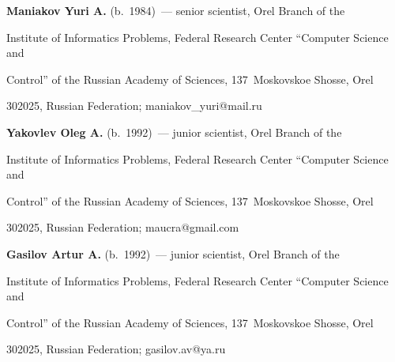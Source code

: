   


  \vspace*{3pt}


  


  \noindent


  \textbf{Maniakov Yuri A.} (b.\ 1984)~--- senior scientist, Orel Branch of the 


Institute of Informatics Problems, Federal Research Center ``Computer Science and 


Control'' of the Russian Academy of Sciences, 137~Moskovskoe Shosse, Orel 


302025, Russian Federation; \mbox{maniakov\_yuri@mail.ru}


  


  \vspace*{3pt}


  


  \noindent


  \textbf{Yakovlev Oleg A.} (b.\ 1992)~--- junior scientist, Orel Branch of the 


Institute of Informatics Problems, Federal Research Center ``Computer Science and 


Control'' of the Russian Academy of Sciences, 137~Moskovskoe Shosse, Orel 


302025, Russian Federation; \mbox{maucra@gmail.com}


  


  \vspace*{3pt}


  


  \noindent


  \textbf{Gasilov Artur A.} (b.\ 1992)~--- junior scientist, Orel Branch of the 


Institute of Informatics Problems, Federal Research Center ``Computer Science and 


Control'' of the Russian Academy of Sciences, 137~Moskovskoe Shosse, Orel 


302025, Russian Federation; \mbox{gasilov.av@ya.ru}


\label{end\stat}








\renewcommand{\bibname}{\protect\rm Литература} 


  


